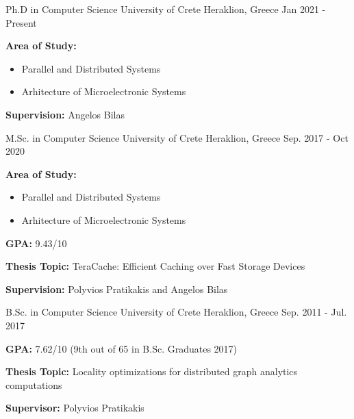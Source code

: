 
\begin{cventries}

  \cventry
    {Ph.D in Computer Science} %
    {University of Crete} %
    {Heraklion, Greece} %
    {Jan 2021 - Present} %
    {
      \begin{cvitems} %
      \item{\textbf{Area of Study:}}
          \begin{itemize}
          \item{Parallel and Distributed Systems}
          \item{Arhitecture of Microelectronic Systems}
          \end{itemize}
        \item{\textbf{Supervision:} Angelos Bilas}
      \end{cvitems}
    }
  \cventry
    {M.Sc. in Computer Science} %
    {University of Crete} %
    {Heraklion, Greece} %
    {Sep. 2017 - Oct 2020} %
    {
      \begin{cvitems} %
      \item{\textbf{Area of Study:}}
          \begin{itemize}
          \item{Parallel and Distributed Systems}
          \item{Arhitecture of Microelectronic Systems}
          \end{itemize}
      \item{\textbf{GPA:} 9.43/10}
      \item{\textbf{Thesis Topic:} 
         TeraCache: Efficient Caching over Fast Storage Devices}
        \item{\textbf{Supervision:} Polyvios Pratikakis and Angelos Bilas}
      \end{cvitems}
    }

  \cventry
    {B.Sc. in Computer Science} %
    {University of Crete} %
    {Heraklion, Greece} %
    {Sep. 2011 - Jul. 2017} %
    {
      \begin{cvitems} %
      \item{\textbf{GPA:} 7.62/10 (9th out of 65 in B.Sc. Graduates 2017)}
      \item{\textbf{Thesis Topic:} Locality optimizations for
          distributed graph analytics computations}
        \item{\textbf{Supervisor:} Polyvios Pratikakis}
      \end{cvitems}
    }

\end{cventries}
